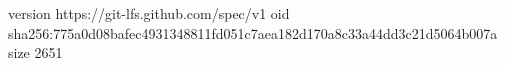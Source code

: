 version https://git-lfs.github.com/spec/v1
oid sha256:775a0d08bafec4931348811fd051c7aea182d170a8c33a44dd3c21d5064b007a
size 2651
